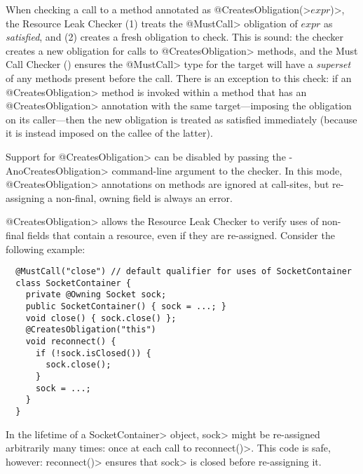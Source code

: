 When checking a call to a method annotated as
\<@CreatesObligation(>$expr$\<)>, the Resource Leak Checker
(1) treats the \<@MustCall>
obligation of $expr$ as \emph{satisfied},
and (2) creates a fresh obligation to check.
This is sound: the checker creates a new obligation for calls to
\<@CreatesObligation> methods, and the Must Call Checker () ensures the
\<@MustCall> type for the target will have a \emph{superset} of any methods present
before the call.
There is an exception to this check: if an \<@CreatesObligation>
method is invoked within a method that has an \<@CreatesObligation> annotation
with the same target---imposing the obligation on its caller---then
the new obligation is treated as satisfied immediately (because it is instead imposed
on the callee of the latter).

Support for \<@CreatesObligation> can be disabled by passing the \<-AnoCreatesObligation> command-line
argument to the checker. In this mode, \<@CreatesObligation> annotations on methods are ignored at call-sites,
but re-assigning a non-final, owning field is always an error.



\<@CreatesObligation> allows the Resource Leak Checker to verify uses of non-final fields
that contain a resource, even if they are re-assigned. Consider
the following example:

\begin{verbatim}
  @MustCall("close") // default qualifier for uses of SocketContainer
  class SocketContainer {
    private @Owning Socket sock;
    public SocketContainer() { sock = ...; }
    void close() { sock.close() };
    @CreatesObligation("this")
    void reconnect() {
      if (!sock.isClosed()) {
        sock.close();
      }
      sock = ...;
    }
  }
\end{verbatim}

In the lifetime of a \<SocketContainer> object, \<sock>
might be re-assigned arbitrarily many times: once at each
call to \<reconnect()>. This code is safe, however: \<reconnect()>
ensures that \<sock> is closed before re-assigning it.

